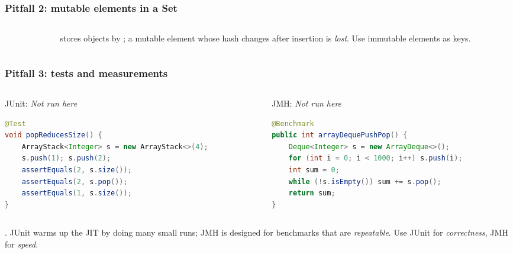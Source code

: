 \documentclass[aspectratio=169,10pt,compress]{beamer}
\begin{document}
\begin{frame}[t,fragile] \frametitle{Pitfall 2: mutable elements in a Set}
  \begin{columns}[T]
    \begin{column}{0.52\textwidth}
    \end{column}
    \begin{column}{0.44\textwidth}
      \small
       stores objects by ; a mutable element
      whose hash changes after insertion is \emph{lost}.
      Use immutable elements as keys.
    \end{column}
  \end{columns}
\end{frame}




\begin{frame}[t,fragile] \frametitle{Pitfall 3: tests and measurements}
  \begin{columns}[T]
    \begin{column}{0.48\textwidth}
      \begin{block}{JUnit: \emph{Not run here}}
        \small
        \begin{lstlisting}[language=Java, basicstyle=\ttfamily\tiny, frame=single]
@Test
void popReducesSize() {
    ArrayStack<Integer> s = new ArrayStack<>(4);
    s.push(1); s.push(2);
    assertEquals(2, s.size());
    assertEquals(2, s.pop());
    assertEquals(1, s.size());
}
        \end{lstlisting}
      \end{block}
    \end{column}
    \begin{column}{0.48\textwidth}
      \begin{block}{JMH: \emph{Not run here}}
        \small
        \begin{lstlisting}[language=Java, basicstyle=\ttfamily\tiny, frame=single]
@Benchmark
public int arrayDequePushPop() {
    Deque<Integer> s = new ArrayDeque<>();
    for (int i = 0; i < 1000; i++) s.push(i);
    int sum = 0;
    while (!s.isEmpty()) sum += s.pop();
    return sum;
}
        \end{lstlisting}
      \end{block}
    \end{column}
  \end{columns}
  \vspace{0.3em}
  \small
  . JUnit warms up the JIT by doing
  many small runs; JMH is designed for benchmarks that are
  \emph{repeatable}. Use JUnit for \emph{correctness},
  JMH for \emph{speed}.
\end{frame}
\end{document}

